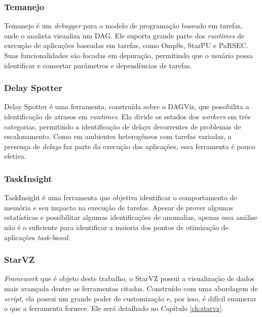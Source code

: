 \subsubsection{Temanejo}

Temanejo \cite{ref:temanejo} é um \emph{debugger} para o modelo de programação 
baseado em tarefas, onde o analista visualiza um DAG. Ele suporta grande parte 
dos \emph{runtimes} de execução de aplicações baseadas em tarefas, como OmpSs, 
StarPU e PaRSEC. Suas funcionalidades são focadas em depuração, permitindo que o 
usuário possa identificar e consertar parâmetros e dependências de tarefas.

\subsubsection{Delay Spotter}

Delay Spotter \cite{ref:delayspotter} é uma ferramenta, construída sobre o 
DAGViz, que possibilita a identificação de atrasos em \emph{runtimes}. Ela 
divide os estados dos \emph{workers} em três categorias, permitindo a 
identificação de delays decorrentes de problemas de escalonamento. Como em 
ambientes heterogêneos com tarefas variadas, a presença de \emph{delays} faz 
parte da execução das aplicações, essa ferramenta é pouco efetiva.

\subsubsection{TaskInsight}

TaskInsight \cite{ref:taskinsight} é uma ferramenta que objetiva identificar o 
comportamento de memória e seu impacto na execução de tarefas. Apesar de prover 
algumas estatísticas e possibilitar algumas identificações de anomalias, apenas 
essa análise não é o suficiente para identificar a maioria dos pontos de 
otimização de aplicações \emph{task-based}.

\subsubsection{StarVZ}

\emph{Framework} que é objeto deste trabalho, o StarVZ \cite{ref:starvz} possui 
a visualização de dados mais avançada dentre as ferramentas citadas. Construído 
com uma abordagem de \emph{script}, ela possui um grande poder de customização 
e, por isso, é difícil enumerar o que a ferramenta fornece. Ele será detalhado 
no Capítulo \ref{ch:starvz}.

